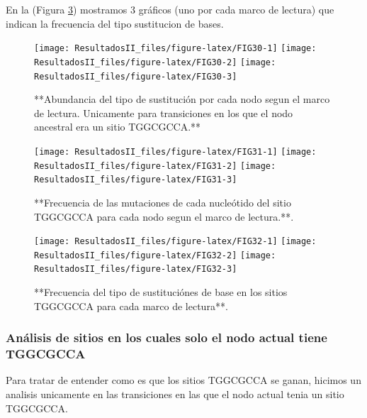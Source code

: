 \documentclass[
]{book}
\begin{document}
En la (Figura \ref{fig:FIG32}) mostramos 3 gráficos (uno por cada marco de lectura) que indican la frecuencia del tipo sustitucion de bases.

\begin{figure}

{\centering \texttt{[image: ResultadosII\_files/figure-latex/FIG30-1]} \texttt{[image: ResultadosII\_files/figure-latex/FIG30-2]} \texttt{[image: ResultadosII\_files/figure-latex/FIG30-3]} 

}

\caption{**Abundancia del tipo de sustitución por cada nodo segun el marco de lectura. Unicamente para transiciones en los que el nodo ancestral era un sitio TGGCGCCA.**}\label{fig:FIG30}
\end{figure}

\begin{figure}

{\centering \texttt{[image: ResultadosII\_files/figure-latex/FIG31-1]} \texttt{[image: ResultadosII\_files/figure-latex/FIG31-2]} \texttt{[image: ResultadosII\_files/figure-latex/FIG31-3]} 

}

\caption{**Frecuencia de las mutaciones de cada nucleótido del sitio TGGCGCCA para cada nodo segun el marco de lectura.**.}\label{fig:FIG31}
\end{figure}

\begin{figure}

{\centering \texttt{[image: ResultadosII\_files/figure-latex/FIG32-1]} \texttt{[image: ResultadosII\_files/figure-latex/FIG32-2]} \texttt{[image: ResultadosII\_files/figure-latex/FIG32-3]} 

}

\caption{**Frecuencia del tipo de sustituciónes de base en los sitios TGGCGCCA para cada marco de lectura**.}\label{fig:FIG32}
\end{figure}

\hypertarget{anuxe1lisis-de-sitios-en-los-cuales-solo-el-nodo-actual-tiene-tggcgcca}{%
\subsubsection{Análisis de sitios en los cuales solo el nodo actual tiene TGGCGCCA}\label{anuxe1lisis-de-sitios-en-los-cuales-solo-el-nodo-actual-tiene-tggcgcca}}

Para tratar de entender como es que los sitios TGGCGCCA se ganan, hicimos un analisis unicamente en las transiciones en las que el nodo actual tenia un sitio TGGCGCCA.
\end{document}
